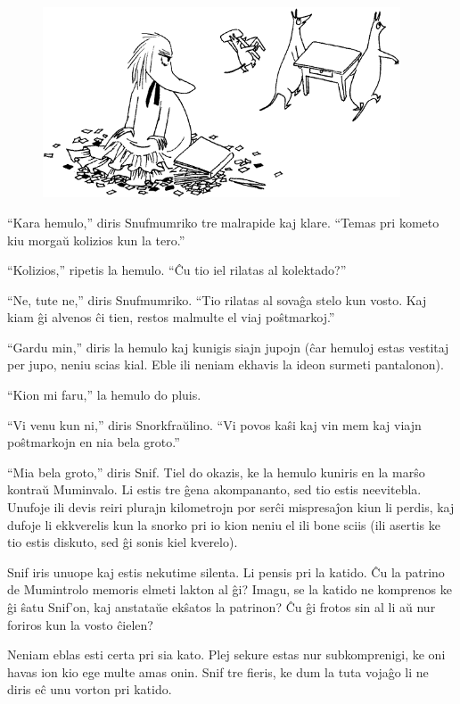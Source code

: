 \begin{figure}[htbp]
\centering
\includegraphics[width=301pt,height=160pt]{8-3.png}
\caption{}
\label{8-3}
\end{figure}

``Kara hemulo,'' diris Snufmumriko tre malrapide kaj klare. ``Temas pri kometo kiu morgaŭ kolizios kun la tero.''

``Kolizios,'' ripetis la hemulo. ``Ĉu tio iel rilatas al kolektado?''

``Ne, tute ne,'' diris Snufmumriko. ``Tio rilatas al sovaĝa stelo kun vosto. Kaj kiam ĝi alvenos ĉi tien, restos malmulte el viaj poŝtmarkoj.''

``Gardu min,'' diris la hemulo kaj kunigis siajn jupojn (ĉar hemuloj estas vestitaj per jupo, neniu scias kial. Eble ili neniam ekhavis la ideon surmeti pantalonon).

``Kion mi faru,'' la hemulo do pluis.

``Vi venu kun ni,'' diris Snorkfraŭlino. ``Vi povos kaŝi kaj vin mem kaj viajn poŝtmarkojn en nia bela groto.''

``Mia bela groto,'' diris Snif.
\sectionbreak
Tiel do okazis, ke la hemulo kuniris en la marŝo kontraŭ Muminvalo. Li estis tre ĝena akompananto, sed tio estis neevitebla. Unufoje ili devis reiri plurajn kilometrojn por serĉi mispresaĵon kiun li perdis, kaj dufoje li ekkverelis kun la snorko pri io kion neniu el ili bone sciis (ili asertis ke tio estis diskuto, sed ĝi sonis kiel kverelo).

Snif iris unuope kaj estis nekutime silenta. Li pensis pri la katido. Ĉu la patrino de Mumintrolo memoris elmeti lakton al ĝi? Imagu, se la katido ne komprenos ke ĝi ŝatu Snif'on, kaj anstataŭe ekŝatos la patrinon? Ĉu ĝi frotos sin al li aŭ nur foriros kun la vosto ĉielen?

Neniam eblas esti certa pri sia kato. Plej sekure estas nur subkomprenigi, ke oni havas ion kio ege multe amas onin. Snif tre fieris, ke dum la tuta vojaĝo li ne diris eĉ unu vorton pri katido.

